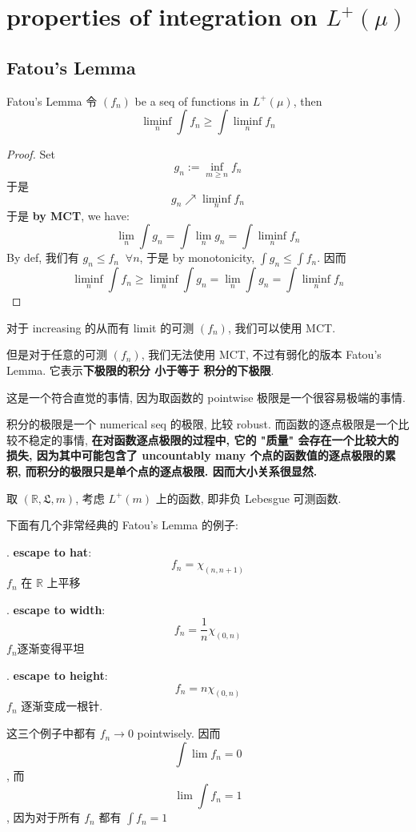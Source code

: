 \documentclass[lang=cn,11pt]{elegantbook}
\begin{document}
\chapter{properties of integration on $L^+(\mu)$}
\section{Fatou's Lemma}
\begin{theorem}{Fatou's Lemma}
    \label{Fatou's Lemma}
 令 $(f_n)$ be a seq of functions in $L^+(\mu)$, then $$ \liminf_n \int f_n \geq \int \liminf_n f_n$$
\end{theorem}

\begin{proof}
    Set \[g_n := \inf_{m \geq n }     f_n   \]于是 \[g_n \nearrow \liminf_n f_n\]
于是\textbf{ by MCT}, we have: \[  \lim_n \int g_n =  \int \lim_n g_n =      \int \liminf_n f_n  \]
By def, 我们有 $g_n \leq f_n \;\;\forall n$, 于是 by monotonicity, $\int g_n \leq \int f_n$. 因而 \[  \liminf_n \int f_n \geq \liminf_n \int g_n  = \lim_n \int g_n = \int \liminf_n f_n   \]
\end{proof}
\begin{remark}
    对于 increasing 的从而有 limit 的可测 $(f_n)$, 我们可以使用 MCT.

    但是对于任意的可测 $(f_n)$, 我们无法使用 MCT, 不过有弱化的版本 Fatou's Lemma. 它表示\textbf{下极限的积分 小于等于 积分的下极限}.

    这是一个符合直觉的事情, 因为取函数的 pointwise 极限是一个很容易极端的事情. 
    
    积分的极限是一个 numerical seq 的极限, 比较 robust. 而函数的逐点极限是一个比较不稳定的事情, \textbf{在对函数逐点极限的过程中, 它的 "质量" 会存在一个比较大的损失, 因为其中可能包含了 uncountably many 个点的函数值的逐点极限的累积, 而积分的极限只是单个点的逐点极限. 因而大小关系很显然. }
\end{remark}


\begin{example}
    取 $(\mathbb{R},\mathfrak{L}, m)$, 考虑 $L^+(m)$ 上的函数, 即非负 Lebesgue 可测函数.

    下面有几个非常经典的 Fatou's Lemma 的例子:

. \textbf{escape to hat}: \[f_n = \chi_{(n,n+1)}\]
$f_n$ 在 $\mathbb{R}$ 上平移

   . \textbf{escape to width}: \[f_n = \frac{1}{n}  \chi_{(0,n)}\]
    $f_n$逐渐变得平坦
    
 . \textbf{escape to height}: \[ f_n = n \chi_{(0,n)}\]
$f_n$ 逐渐变成一根针.

这三个例子中都有 $f_n \rightarrow 0$ pointwisely. 因而 $$\int \lim f_n = 0$$, 而 $$\lim \int f_n = 1$$, 因为对于所有 $f_n$ 都有 $\int f_n = 1$
\end{example}
\end{document}
